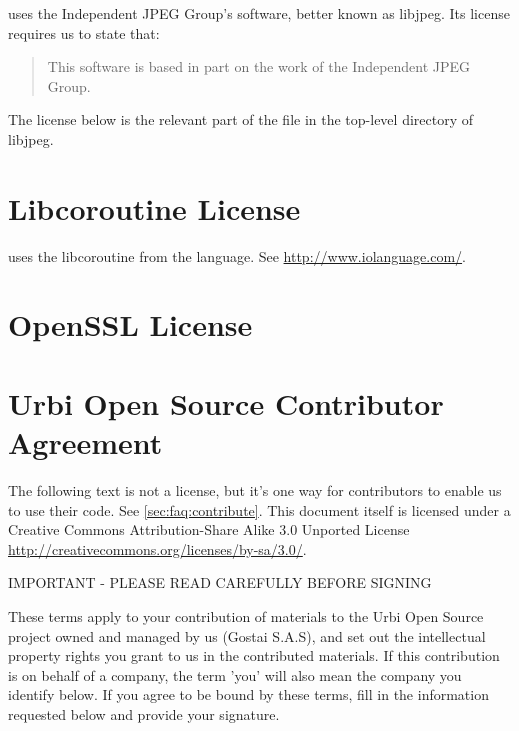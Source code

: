 \usdk uses the Independent JPEG Group's software, better known as libjpeg.
Its license requires us to state that:

\begin{quote}
  This software is based in part on the work of the Independent JPEG Group.
\end{quote}

The license below is the relevant part of the  file in the
top-level directory of libjpeg.



\section{Libcoroutine License}

\urbi uses the libcoroutine from the  language.  See
\url{http://www.iolanguage.com/}.


\section{OpenSSL License}


\clearpage
\section{Urbi Open Source Contributor Agreement}
\label{sec:license:uosca}

The following text is not a license, but it's one way for \usdk contributors
to enable us to use their code.  See \autoref{sec:faq:contribute}.  This
document itself is licensed under a Creative Commons Attribution-Share Alike
3.0 Unported License \url{http://creativecommons.org/licenses/by-sa/3.0/}.


\begin{center}
  IMPORTANT - PLEASE READ CAREFULLY BEFORE SIGNING
\end{center}

These terms apply to your contribution of materials to the Urbi Open Source
project owned and managed by us (Gostai S.A.S), and set out the intellectual
property rights you grant to us in the contributed materials. If this
contribution is on behalf of a company, the term 'you' will also mean the
company you identify below. If you agree to be bound by these terms, fill in
the information requested below and provide your signature.

